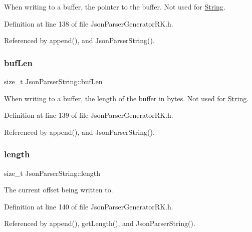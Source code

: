 When writing to a buffer, the pointer to the buffer. Not used for \hyperlink{class_string}{String}. 



Definition at line 138 of file Json\+Parser\+Generator\+R\+K.\+h.



Referenced by append(), and Json\+Parser\+String().

\mbox{\label{class_json_parser_string_a376957bb37fc229f44d0d85ce74adb4a}} 
\subsubsection{\texorpdfstring{buf\+Len}{bufLen}}
{\footnotesize\ttfamily size\+\_\+t Json\+Parser\+String\+::buf\+Len\hspace{0.3cm}{\ttfamily [protected]}}



When writing to a buffer, the length of the buffer in bytes. Not used for \hyperlink{class_string}{String}. 



Definition at line 139 of file Json\+Parser\+Generator\+R\+K.\+h.



Referenced by append(), and Json\+Parser\+String().

\mbox{\label{class_json_parser_string_a2b3a350599c49f6e7e368fc8b508cf6f}} 
\subsubsection{\texorpdfstring{length}{length}}
{\footnotesize\ttfamily size\+\_\+t Json\+Parser\+String\+::length\hspace{0.3cm}{\ttfamily [protected]}}



The current offset being written to. 



Definition at line 140 of file Json\+Parser\+Generator\+R\+K.\+h.



Referenced by append(), get\+Length(), and Json\+Parser\+String().

